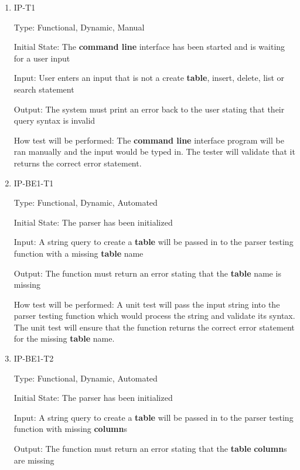 \documentclass[12pt, titlepage]{article}
\begin{document}
\begin{enumerate}

\item{IP-T1}

Type: Functional, Dynamic, Manual
					
Initial State: The \textbf{command line} interface has been started and is waiting for a user input
					
Input: User enters an input that is not a create \textbf{table}, insert, delete, list or search statement
					
Output: The system must print an error back to the user stating that their query syntax is invalid
					
How test will be performed: The \textbf{command line} interface program will be ran manually and the input would be typed in. The tester will validate that it returns the correct error statement.

\item{IP-BE1-T1}

Type: Functional, Dynamic, Automated
					
Initial State: The parser has been initialized
					
Input: A string query to create a \textbf{table} will be passed in to the parser testing function with a missing \textbf{table} name
					
Output: The function must return an error stating that the \textbf{table} name is missing
					
How test will be performed: A unit test will pass the input string into the parser testing function which would process the string and validate its syntax. The unit test will ensure that the function returns the correct error statement for the missing \textbf{table} name.

\item{IP-BE1-T2}

Type: Functional, Dynamic, Automated
					
Initial State: The parser has been initialized
					
Input: A string query to create a \textbf{table} will be passed in to the parser testing function with missing \textbf{column}s
					
Output: The function must return an error stating that the \textbf{table} \textbf{column}s are missing
					

\end{enumerate}
\end{document}
